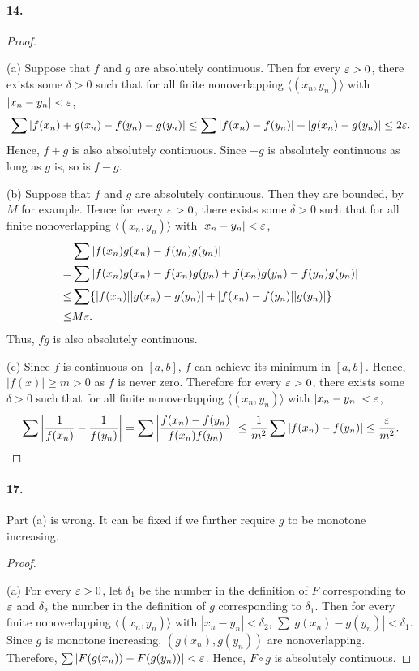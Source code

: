   \paragraph{14.}
  \begin{proof}
    $\,$\par
    (a) Suppose that $f$ and $g$ are absolutely continuous. Then for every 
    $\varepsilon>0$, there exists some $\delta>0$ such that for all finite 
    nonoverlapping $\langle(x_n,y_n)\rangle$ with $|x_n-y_n|<\varepsilon$, 
    \[
      \sum |f(x_n)+g(x_n)-f(y_n)-g(y_n)| \le
      \sum |f(x_n)-f(y_n)|+|g(x_n)-g(y_n)| \le 2\varepsilon.
    \]
    Hence, $f+g$ is also absolutely continuous. Since $-g$ is absolutely 
    continuous as long as $g$ is, so is $f-g$. \par
    (b) Suppose that $f$ and $g$ are absolutely continuous. Then they are 
    bounded, by $M$ for example. Hence for every $\varepsilon>0$, there exists some
    $\delta>0$ such that for all finite nonoverlapping $\langle(x_n,y_n)\rangle$
    with $|x_n-y_n|<\varepsilon$, 
    \begin{align*}
      &\sum |f(x_n)g(x_n)-f(y_n)g(y_n)| \\
      =&\sum |f(x_n)g(x_n)-f(x_n)g(y_n) + f(x_n)g(y_n)-f(y_n)g(y_n)| \\ 
      \le&\sum \{|f(x_n)||g(x_n)-g(y_n)| + |f(x_n)-f(y_n)||g(y_n)|\} \\
      \le& M\varepsilon.
    \end{align*}
    Thus, $fg$ is also absolutely continuous.\par
    (c) Since $f$ is continuous on $[a,b]$, $f$ can achieve its minimum in $[a,
    b]$. Hence, $|f(x)|\ge m>0$ as $f$ is never zero. Therefore for every $\varepsilon>
    0$, there exists some $\delta>0$ such that for all finite nonoverlapping
    $\langle(x_n,y_n)\rangle$ with $|x_n-y_n|<\varepsilon$,
    \begin{align*}
        \sum\left|\frac{1}{f(x_n)}-\frac{1}{f(y_n)}\right|
      = \sum\left|\frac{f(x_n)-f(y_n)}{f(x_n)f(y_n)}\right|
      \le \frac{1}{m^2}\sum|f(x_n)-f(y_n)|\le \frac{\varepsilon}{m^2}.
    \end{align*}
  \end{proof}

  \paragraph{17.}
    Part (a) is wrong. It can be fixed if we further require $g$ to be monotone
    increasing.
  \begin{proof}
    $\,$\par
    (a) For every $\varepsilon>0$, let $\delta_1$ be the number in the definition of 
    $F$ corresponding to $\varepsilon$ and $\delta_2$ the number in the definition of
    $g$ corresponding to $\delta_1$. Then for every finite nonoverlapping
    $\langle (x_n, y_n)\rangle$ with $|x_n-y_n|<\delta_2$, $\sum |g(x_n)-g(y_n)|
    < \delta_1$. Since $g$ is monotone increasing, $(g(x_n), g(y_n))$ are 
    nonoverlapping. Therefore, $\sum|F(g(x_n))-F(g(y_n))|<\varepsilon$. Hence, $F\circ
    g$ is absolutely continuous.
  \end{proof}

